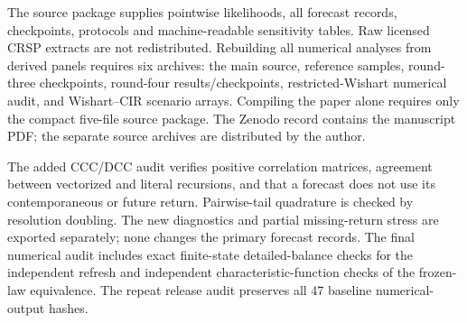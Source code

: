 \documentclass[11pt]{article}
\theoremstyle{definition}\newtheorem{definition}[theorem]{Definition}
\theoremstyle{remark}\newtheorem{remark}[theorem]{Remark}
\begin{document}
The source package supplies pointwise likelihoods, all forecast records, checkpoints, protocols and machine-readable sensitivity tables. Raw licensed CRSP extracts are not redistributed. Rebuilding all numerical analyses from derived panels requires six archives: the main source, reference samples, round-three checkpoints, round-four results/checkpoints, restricted-Wishart numerical audit, and Wishart--CIR scenario arrays. Compiling the paper alone requires only the compact five-file source package. The Zenodo record contains the manuscript PDF; the separate source archives are distributed by the author.

The added CCC/DCC audit verifies positive correlation matrices, agreement between vectorized and literal recursions, and that a forecast does not use its contemporaneous or future return. Pairwise-tail quadrature is checked by resolution doubling. The new diagnostics and partial missing-return stress are exported separately; none changes the primary forecast records. The final numerical audit includes exact finite-state detailed-balance checks for the independent refresh and independent characteristic-function checks of the frozen-law equivalence. The repeat release audit preserves all 47 baseline numerical-output hashes.



\end{document}
